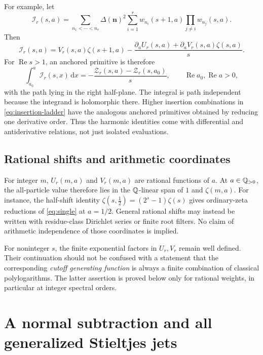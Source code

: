 \documentclass[11pt,letterpaper]{article}
\numberwithin{equation}{section}
\theoremstyle{definition}\newtheorem{definition}[theorem]{Definition}
\theoremstyle{remark}\newtheorem{remark}[theorem]{Remark}
\DeclareMathOperator{\Rea}{Re}
\newcommand{\Z}{\mathcal Z}\newcommand{\Bell}{\mathcal B}
\newcommand{\dd}{\,\mathrm d}
\begin{document}
For example, let
\[
 \mathcal I_r(s,a)=\sum_{n_1<\cdots<n_r}\Delta(\bm n)^2
        \sum_{i=1}^r w_{n_i}(s+1,a)\prod_{j\ne i}w_{n_j}(s,a).
\]
Then
\begin{equation}\label{eq:first-insertion}
 \mathcal I_r(s,a)=V_r(s,a)\zeta(s+1,a)
   -\frac{\partial_aU_r(s,a)+\partial_aV_r(s,a)\zeta(s,a)}s.
\end{equation}
For $\Rea s>1$, an anchored primitive is therefore
\begin{equation}\label{eq:insertion-primitive}
 \int_{a_0}^{a}\mathcal I_r(s,x)\dd x
       =-\frac{\Z_r(s,a)-\Z_r(s,a_0)}s,
 \qquad \Rea a_0,\Rea a>0,
\end{equation}
with the path lying in the right half-plane. The integral is path
independent because the integrand is holomorphic there. Higher insertion
combinations in \eqref{eq:insertion-ladder} have the analogous anchored
primitives obtained by reducing one derivative order. Thus the harmonic
identities come with differential and antiderivative relations, not just
isolated evaluations.

\subsection{Rational shifts and arithmetic coordinates}
For integer $m$, $U_r(m,a)$ and $V_r(m,a)$ are rational functions of $a$.
At $a\in\mathbb Q_{>0}$, the all-particle value therefore lies in the
$\mathbb Q$-linear span of $1$ and $\zeta(m,a)$.
For instance, the half-shift identity
$\zeta(s,\tfrac12)=(2^s-1)\zeta(s)$ gives ordinary-zeta reductions
of \eqref{eq:single} at $a=1/2$. General rational shifts may instead
be written with residue-class Dirichlet series or finite root filters.
No claim of arithmetic independence of those coordinates is implied.

For noninteger $s$, the finite exponential factors in $U_r,V_r$ remain
well defined. Their continuation should not be confused with a statement
that the corresponding \emph{cutoff generating function} is always a
finite combination of classical polylogarithms. The latter assertion is
proved below only for rational weights, in particular at integer spectral
orders.

\section{A normal subtraction and all generalized Stieltjes jets}
\label{sec:stieltjes}
\end{document}
